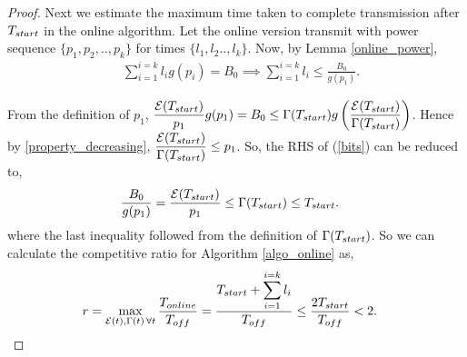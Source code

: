 \begin{proof}
Next we estimate the maximum time taken to complete transmission after $T_{\mbox{\scriptsize{start}}}$ in the online algorithm. Let the online version transmit with power sequence $\{p_1,p_2,..,p_k\}$ for times $\{l_1,l_2..,l_k\} $. Now, by Lemma \ref{online_power},
\begin{align}
&\sum_{i=1}^{i=k}l_ig(p_i)=B_0\implies\sum_{i=1}^{i=k}l_i\le \frac{B_0}{g(p_1)}.\label{bits}
\end{align}

From the definition of $p_1$, $\dfrac{\ETx(T_{\mbox{\scriptsize{start}}})}{p_1}g(p_1)=B_0 \le \TRx(T_{\mbox{\scriptsize{start}}}) g\left( \dfrac{\ETx(T_{\mbox{\scriptsize{start}}})}{\TRx(T_{\mbox{\scriptsize{start}}})} \right)$. Hence by \eqref{property_decreasing}, $\dfrac{\ETx(T_{\mbox{\scriptsize{start}}})}{\TRx(T_{\mbox{\scriptsize{start}}})}\le p_1$.\vspace{2pt}
So, the RHS of (\ref{bits}) can be reduced to, 
\begin{align}
&\frac{B_0}{g(p_1)} = \frac{\ETx(T_{\mbox{\scriptsize{start}}})}{p_1} \le \TRx(T_{\mbox{\scriptsize{start}}})\le T_{\mbox{\scriptsize{start}}}.
\end{align}
where the last inequality followed from the definition of $\TRx(T_{\mbox{\scriptsize{start}}})$. So we can calculate the competitive ratio for Algorithm \ref{algo_online} as,
\begin{align*}
&r=\displaystyle\max_{\ETx(t),\TRx(t)\hspace{0.5mm} \forall t}\dfrac{T_{\mbox{\scriptsize{online}}}}{T_{\mbox{\scriptsize{off}}}} = \dfrac{T_{\mbox{\scriptsize{start}}}+\displaystyle\sum_{i=1}^{i=k}l_i}{T_{\mbox{\scriptsize{off}}}} \le \dfrac{2 T_{\mbox{\scriptsize{start}}}}{T_{\mbox{\scriptsize{off}}}} < 2.
\end{align*}
\end{proof}
